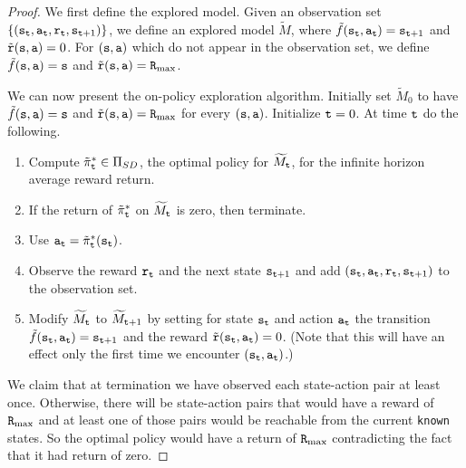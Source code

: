 \begin{proof}
We first define the explored model. Given an observation set
$\{({\tt s}_{\tt t},{\tt a}_{\tt t} ,{\tt r}_{\tt t},
{\tt s}_{{\tt t}+1})\}$, we define an explored model $\widetilde{M}$,
where $\tilde{f}({\tt s}_{\tt t},{\tt a}_{\tt t})={\tt s}_{{\tt t}+1}$
and $\tilde{{\tt r}}({\tt s},{\tt a})=0$.
%
For $({\tt s},{\tt a})$ which do not appear in the observation set,
we define $\tilde{f}({\tt s},{\tt a})={\tt s}$ and
$\tilde{{\tt r}}({\tt s},{\tt a})={\tt R}_{\max }$.


We can now present the on-policy exploration algorithm. Initially
set $\widetilde{M}_0$ to have $\tilde{f}({\tt s},{\tt a})={\tt s}$ and
$\tilde{{\tt r}}({\tt s},{\tt a})={\tt R}_{\max }$ for every $({\tt s},{\tt a})$. Initialize ${\tt t}=0$. At
time ${\tt t}$ do the following.
\begin{enumerate}
\item
Compute $\tilde{\pi}^*_{\tt t}\in \Pi_{SD}$, the optimal policy for
$\widetilde{M}_{\tt t}$, for the infinite horizon average reward return.
\item
If the return of $\tilde{\pi}^*_{\tt t}$ on $\widetilde{M}_{\tt t}$ is
zero, then terminate.
\item
Use ${\tt a}_{\tt t}=\tilde{\pi}^*_{\tt t}({\tt s}_{{\tt t}})$.
\item
Observe the reward ${\tt r}_{\tt t}$ and the next state
${\tt s}_{{\tt t}+1}$ and add
$({\tt s}_{\tt t},{\tt a}_{\tt t},{\tt r}_{\tt t},{\tt s}_{{\tt t}+1})$ to
the observation set.
\item
Modify $\widetilde{M}_{\tt t}$ to  $\widetilde{M}_{{\tt t}+1}$
by setting for state ${\tt s}_{\tt t}$ and action ${\tt a}_{\tt t}$ the
transition $\tilde{f}({\tt s}_{\tt t},{\tt a}_{\tt t})={\tt s}_{{\tt t}+1}$
and the reward $\tilde{{\tt r}}({\tt s}_{\tt t},{\tt a}_{\tt t})=0$.
(Note that this will have an effect only the first time we encounter
$({\tt s}_{\tt t},{\tt a}_{\tt t})$.)
\end{enumerate}

We claim that at termination we have observed each state-action pair
at least once. Otherwise, there will be state-action pairs that
would have a reward of ${\tt R}_{\max }$ and at least one of those pairs would
be reachable from the current \texttt{known} states. So the optimal policy
would have a return of ${\tt R}_{\max }$ contradicting the fact that it had
return of zero.


\end{proof}
